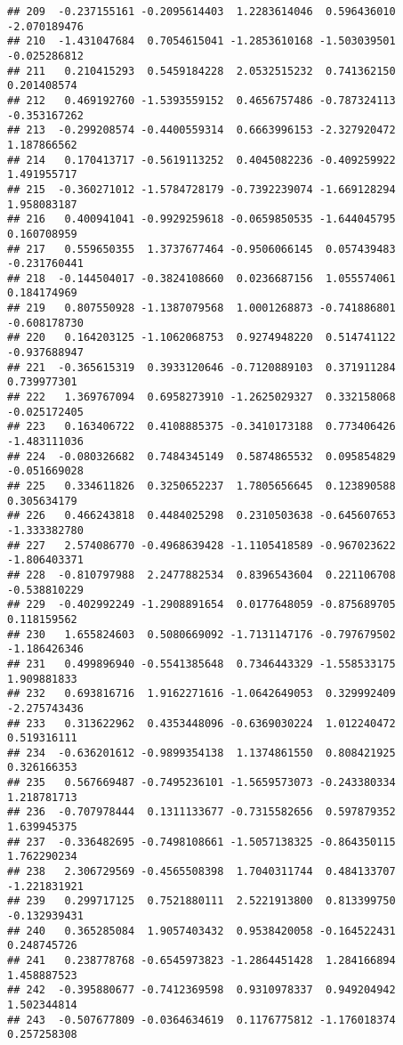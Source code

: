 \documentclass[
]{article}
\begin{document}
\begin{verbatim}
## 209  -0.237155161 -0.2095614403  1.2283614046  0.596436010 -2.070189476
## 210  -1.431047684  0.7054615041 -1.2853610168 -1.503039501 -0.025286812
## 211   0.210415293  0.5459184228  2.0532515232  0.741362150  0.201408574
## 212   0.469192760 -1.5393559152  0.4656757486 -0.787324113 -0.353167262
## 213  -0.299208574 -0.4400559314  0.6663996153 -2.327920472  1.187866562
## 214   0.170413717 -0.5619113252  0.4045082236 -0.409259922  1.491955717
## 215  -0.360271012 -1.5784728179 -0.7392239074 -1.669128294  1.958083187
## 216   0.400941041 -0.9929259618 -0.0659850535 -1.644045795  0.160708959
## 217   0.559650355  1.3737677464 -0.9506066145  0.057439483 -0.231760441
## 218  -0.144504017 -0.3824108660  0.0236687156  1.055574061  0.184174969
## 219   0.807550928 -1.1387079568  1.0001268873 -0.741886801 -0.608178730
## 220   0.164203125 -1.1062068753  0.9274948220  0.514741122 -0.937688947
## 221  -0.365615319  0.3933120646 -0.7120889103  0.371911284  0.739977301
## 222   1.369767094  0.6958273910 -1.2625029327  0.332158068 -0.025172405
## 223   0.163406722  0.4108885375 -0.3410173188  0.773406426 -1.483111036
## 224  -0.080326682  0.7484345149  0.5874865532  0.095854829 -0.051669028
## 225   0.334611826  0.3250652237  1.7805656645  0.123890588  0.305634179
## 226   0.466243818  0.4484025298  0.2310503638 -0.645607653 -1.333382780
## 227   2.574086770 -0.4968639428 -1.1105418589 -0.967023622 -1.806403371
## 228  -0.810797988  2.2477882534  0.8396543604  0.221106708 -0.538810229
## 229  -0.402992249 -1.2908891654  0.0177648059 -0.875689705  0.118159562
## 230   1.655824603  0.5080669092 -1.7131147176 -0.797679502 -1.186426346
## 231   0.499896940 -0.5541385648  0.7346443329 -1.558533175  1.909881833
## 232   0.693816716  1.9162271616 -1.0642649053  0.329992409 -2.275743436
## 233   0.313622962  0.4353448096 -0.6369030224  1.012240472  0.519316111
## 234  -0.636201612 -0.9899354138  1.1374861550  0.808421925  0.326166353
## 235   0.567669487 -0.7495236101 -1.5659573073 -0.243380334  1.218781713
## 236  -0.707978444  0.1311133677 -0.7315582656  0.597879352  1.639945375
## 237  -0.336482695 -0.7498108661 -1.5057138325 -0.864350115  1.762290234
## 238   2.306729569 -0.4565508398  1.7040311744  0.484133707 -1.221831921
## 239   0.299717125  0.7521880111  2.5221913800  0.813399750 -0.132939431
## 240   0.365285084  1.9057403432  0.9538420058 -0.164522431  0.248745726
## 241   0.238778768 -0.6545973823 -1.2864451428  1.284166894  1.458887523
## 242  -0.395880677 -0.7412369598  0.9310978337  0.949204942  1.502344814
## 243  -0.507677809 -0.0364634619  0.1176775812 -1.176018374  0.257258308

\end{verbatim}
\end{document}
